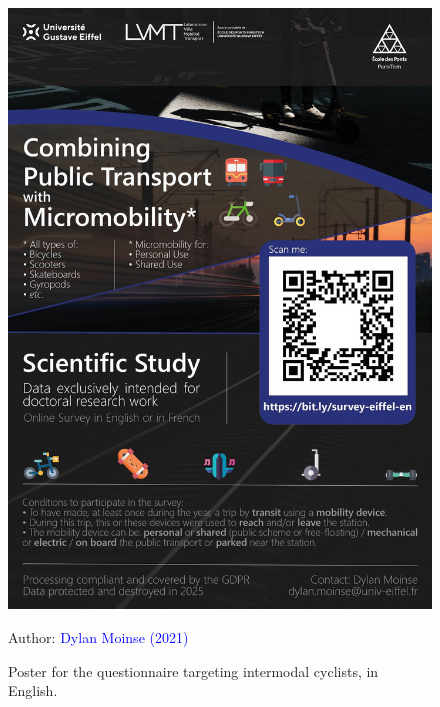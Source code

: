 \begin{refsegment}
\begin{figure}[h!]\vspace*{4pt}
    \caption{Poster for the questionnaire targeting intermodal cyclists, in English.}
    \label{fig-chap3:affiche-questionnaire}
    \centerline{\includegraphics[width=1\columnwidth]{src/Figures/Chap-3/EN_Affiche_Questionnaire.jpg}}
    \vspace{5pt}
    \begin{flushright}\scriptsize{
    Author: \textcolor{blue}{Dylan Moinse (2021)}
    }\end{flushright}
\end{figure}


\end{refsegment}
